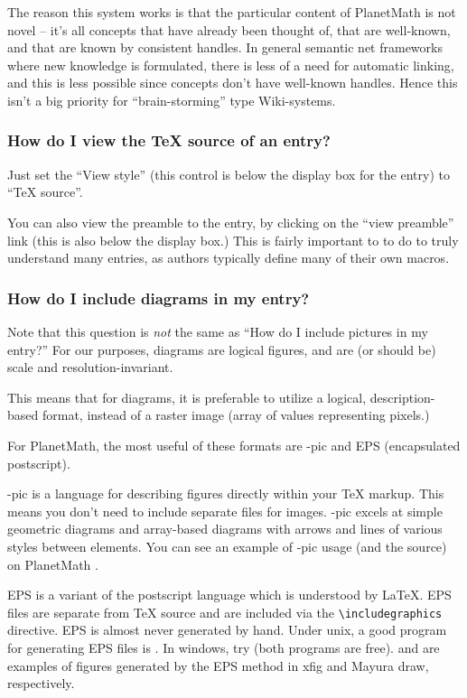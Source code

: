 The reason this system works is that the particular content of PlanetMath is not novel -- it's all concepts that have already been thought of, that are well-known, and that are known by consistent handles. In general semantic net frameworks where new knowledge is formulated, there is less of a need for automatic linking, and this is less possible since concepts don't have well-known handles. Hence this isn't a big priority for ``brain-storming'' type Wiki-systems.

\subsubsection*{How do I view the \TeX{} source of an entry?}
Just set the ``View style'' (this control is below the display box for the entry) to ``TeX source''.

You can also view the preamble to the entry, by clicking on the ``view preamble'' link (this is also below the display box.) This is fairly important to to do to truly understand many entries, as authors typically define many of their own macros.

\subsubsection*{How do I include diagrams in my entry?}
Note that this question is \emph{not} the same as ``How do I include pictures in my entry?'' For our purposes, diagrams are logical figures, and are (or should be) scale and resolution-invariant.

This means that for diagrams, it is preferable to utilize a logical, description-based format, instead of a raster image (array of values representing pixels.)

For PlanetMath, the most useful of these formats are \Xy-pic and EPS (encapsulated postscript).

\Xy-pic is a language for describing figures directly within your TeX markup. This means you don't need to include separate files for images. \Xy-pic excels at simple geometric diagrams and array-based diagrams with arrows and lines of various styles between elements. You can see an example of \Xy-pic usage (and the source) on PlanetMath .

EPS is a variant of the postscript language which is understood by \LaTeX. EPS files are separate from \TeX{} source and are included via the \texttt{\textbackslash{}includegraphics} directive. EPS is almost never generated by hand. Under unix, a good program for generating EPS files is . In windows, try  (both programs are free).  and  are examples of figures generated by the EPS method in xfig and Mayura draw, respectively.

